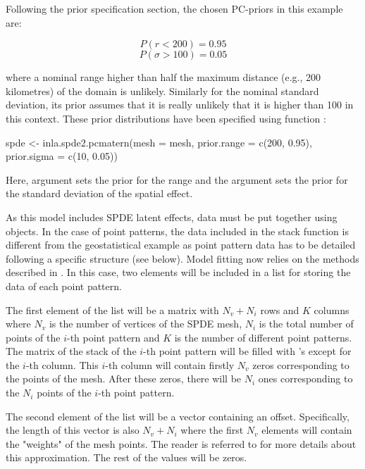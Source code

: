 \noindent
Following the prior specification section, the chosen PC-priors in this example are:


$$ P(r < 200) = 0.95$$
$$ P(\sigma > 100) = 0.05 $$

\noindent
where a nominal range higher than half the maximum distance (e.g., 200 kilometres) of the domain is unlikely. Similarly for the nominal standard deviation, its prior assumes that it is really unlikely that it is higher than 100 in this context. These prior distributions have been specified using function :

\begin{example*}
spde <- inla.spde2.pcmatern(mesh = mesh,
  prior.range = c(200, 0.95),  prior.sigma = c(10, 0.05)) 
\end{example*}

\noindent
Here, argument  sets the prior for the range and the argument  sets the prior for the standard deviation of the spatial effect. 

\medskip
As this model includes SPDE latent effects, data must be put together using  objects. In the case of point patterns, the data included in the stack function is different from the geostatistical example as point pattern data has to be detailed following a specific structure (see below). Model fitting now relies on the methods described in \cite{Simpsonetal:2016}. In this case, two elements will be included in a list for storing the data of each point pattern.

\medskip
The first element of the list will be a matrix with $N_v + N_i$ rows and $K$ columns where $N_v$ is the number of vertices of the SPDE mesh, $N_i$ is the total number of points of the $i$-th point pattern and $K$ is the number of different point patterns. The matrix of the stack of the $i$-th point pattern will be filled with 's except for the $i$-th column. This $i$-th column will contain firstly $N_v$ zeros corresponding to the points of the mesh. After these zeros, there will be $N_i$ ones corresponding to the $N_i$ points of the $i$-th point pattern.

\medskip
The second element of the list will be a vector containing an offset. Specifically, the length of this vector is also $N_v + N_i$ where the first $N_v$ elements will contain the "weights" of the mesh points. The reader is referred to \citet{Simpsonetal:2016} for more details about this approximation. The rest of the values will be zeros.

